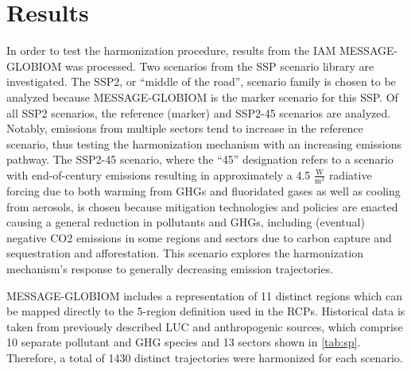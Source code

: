 \section{Results}\label{sec:results}

In order to test the  harmonization procedure, results from the IAM
MESSAGE-GLOBIOM \cite{fricko_marker_2017} was processed. Two scenarios from the
SSP scenario library \cite{Riahi2017153,Rao2017346} are investigated. The SSP2,
or ``middle of the road'', scenario family is chosen to be analyzed because
MESSAGE-GLOBIOM is the marker scenario for this SSP. Of all SSP2 scenarios, the
reference (marker) and SSP2-45 scenarios are analyzed. Notably, emissions from
multiple sectors tend to increase in the reference scenario, thus testing the
harmonization mechanism with an increasing emissions pathway. The SSP2-45
scenario, where the ``45'' designation refers to a scenario with end-of-century
emissions resulting in approximately a 4.5 $\frac{\text{W}}{\text{m}^2}$
radiative forcing due to both warming from GHGs and fluoridated gases as well as
cooling from aerosols, is chosen because mitigation technologies and policies
are enacted causing a general reduction in pollutants and GHGs, including
(eventual) negative CO2 emissions in some regions and sectors due to carbon
capture and sequestration and afforestation. This scenario explores the
harmonization mechanism's response to generally decreasing emission
trajectories.
% 
% 

MESSAGE-GLOBIOM includes a representation of 11 distinct regions which can be
mapped directly to the 5-region definition used in the RCPs. Historical data is
taken from previously described LUC and anthropogenic sources, which comprise 10
separate pollutant and GHG species and 13 sectors shown in
\ref{tab:sp}. Therefore, a total of 1430 distinct trajectories were harmonized
for each scenario.

